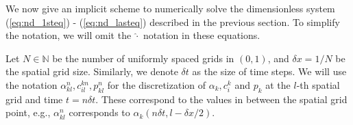 \documentclass{article}
\begin{document}

We now give an implicit scheme to numerically solve the dimensionless system (\ref{eq:nd_1steq}) - (\ref{eq:nd_lasteq}) described in the previous section.
To simplify the notation, we will omit the $\hat{\cdot}$ notation in these equations.

Let $N\in \mathbb{N}$ be the number of uniformly spaced grids in $(0,1)$, and $\delta x = 1/N$ be the spatial grid size.
Similarly, we denote $\delta t$ as the size of time steps.
We will use the notation $\alpha^{n}_{kl},c_{il}^{kn}, p_{kl}^{n}$ for the discretization of $\alpha_k,c_i^k$ and $p_k$ at the $l$-th spatial grid and time $t = n\delta t$.
These correspond to the values in between the spatial grid point, e.g., $\alpha_{kl}^n$ corresponds to $\alpha_k(n\delta t,l-\delta x/2)$.
\end{document}
